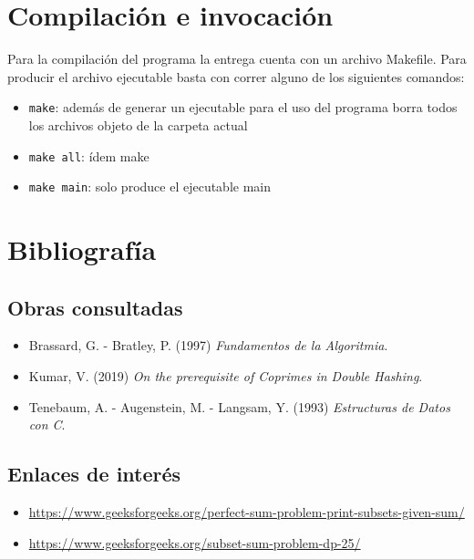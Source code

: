 \documentclass[11pt]{article}
\begin{document}
\section{Compilaci\'on e invocaci\'on}
Para la compilaci\'on del programa la entrega cuenta con un archivo Makefile. Para producir el archivo ejecutable basta 
con correr alguno de los siguientes comandos: 

\begin{itemize}
    \item \verb|make|: adem\'as de generar un ejecutable para el uso del programa borra todos los archivos objeto de la carpeta actual
    \item \verb|make all|: \'idem make
    \item \verb|make main|: solo produce el ejecutable main
\end{itemize}

\section{Bibliograf\'ia}

\subsection{Obras consultadas}
\begin{itemize}
    \item Brassard, G. - Bratley, P. (1997) \emph{Fundamentos de la Algoritmia}.
    \item Kumar, V. (2019) \emph{On the prerequisite of Coprimes in Double Hashing}.
    \item Tenebaum, A. - Augenstein, M. - Langsam, Y. (1993) \emph{Estructuras de Datos con C}.
\end{itemize}

\subsection{Enlaces de inter\'es}
\begin{itemize}
    \item \href{https://www.geeksforgeeks.org/perfect-sum-problem-print-subsets-given-sum/}{https://www.geeksforgeeks.org/perfect-sum-problem-print-subsets-given-sum/}
    \item \href{https://www.geeksforgeeks.org/subset-sum-problem-dp-25/}{https://www.geeksforgeeks.org/subset-sum-problem-dp-25/}
\end{itemize}
\end{document}
